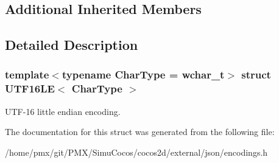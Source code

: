 \subsection*{Additional Inherited Members}


\subsection{Detailed Description}
\subsubsection*{template$<$typename Char\+Type = wchar\+\_\+t$>$\newline
struct U\+T\+F16\+L\+E$<$ Char\+Type $>$}

U\+T\+F-\/16 little endian encoding. 

The documentation for this struct was generated from the following file\+:\begin{DoxyCompactItemize}
\item 
/home/pmx/git/\+P\+M\+X/\+Simu\+Cocos/cocos2d/external/json/encodings.\+h\end{DoxyCompactItemize}
